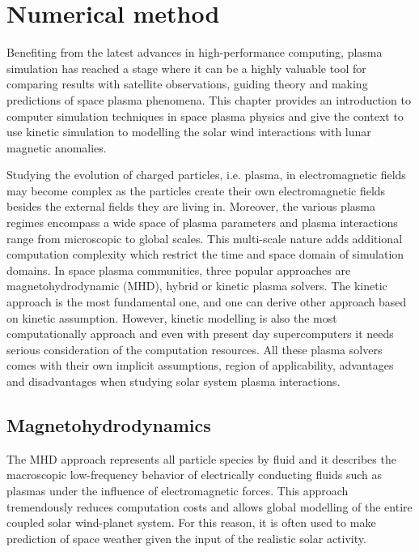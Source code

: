 
\chapter{Numerical method}

Benefiting from the latest advances in high-performance computing, plasma simulation has reached a stage where it can be a highly valuable tool for comparing results with satellite observations, guiding theory and making predictions of space plasma phenomena. This chapter provides an introduction to computer simulation techniques in space plasma physics and give the context to use kinetic simulation to modelling the solar wind interactions with lunar magnetic anomalies.
    
Studying the evolution of charged particles, i.e. plasma, in electromagnetic fields may become complex as the particles create their own electromagnetic fields besides the external fields they are living in. Moreover, the various plasma regimes encompass a wide space of plasma parameters and plasma interactions range from microscopic to global scales. This multi-scale nature adds additional computation complexity which restrict the time and space domain of simulation domains. In space plasma communities, three popular approaches are magnetohydrodynamic (MHD), hybrid or kinetic plasma solvers. The kinetic approach is the most fundamental one, and one can derive other approach based on kinetic assumption. However, kinetic modelling is also the most computationally approach and even with present day supercomputers it needs serious consideration of the computation resources. All these plasma solvers comes with their own implicit assumptions, region of applicability, advantages and disadvantages when studying solar system plasma interactions.

\section{Magnetohydrodynamics}

The MHD approach represents all particle species by fluid and it describes the macroscopic low-frequency behavior of electrically conducting fluids such as plasmas under the influence of electromagnetic forces. This approach tremendously reduces computation costs and allows global modelling of the entire coupled solar wind-planet system. For this reason, it is often used to make prediction of space weather given the input of the realistic solar activity.

